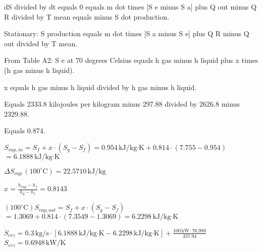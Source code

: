 dS divided by dt equals 0 equals m dot times [S e minus S a] plus Q out minus Q R divided by T mean equals minus S dot production.  

Stationary:  
S production equals m dot times [S a minus S e] plus Q R minus Q out divided by T mean.  

From Table A2:  
S e at 70 degrees Celsius equals h gas minus h liquid plus x times (h gas minus h liquid).  

x equals h gas minus h liquid divided by h gas minus h liquid.  

Equals 2333.8 kilojoules per kilogram minus 297.88 divided by 2626.8 minus 2329.88.  

Equals 0.874.

\( S_{vap,in} = S_f + x \cdot (S_g - S_f) = 0.954 \, \text{kJ/kg·K} + 0.814 \cdot (7.755 - 0.954) \)  
\( = 6.1888 \, \text{kJ/kg·K} \)  

\( \Delta S_{vap} \, (100^\circ \text{C}) = 22.5710 \, \text{kJ/kg} \)  

\( x = \frac{h_{vap} - h_f}{h_g - h_f} = 0.8143 \)  

\( (100^\circ \text{C}) S_{vap,out} = S_f + x \cdot (S_g - S_f) \)  
\( = 1.3069 + 0.814 \cdot (7.3549 - 1.3069) = 6.2298 \, \text{kJ/kg·K} \)  

\( \dot{S}_{erz} = 0.3 \, \text{kg/s} \cdot \left[ 6.1888 \, \text{kJ/kg·K} - 6.2298 \, \text{kJ/kg·K} \right] + \frac{100 \, \text{kW} \cdot 76.980}{357.94} \)  
\( \dot{S}_{erz} = 0.6948 \, \text{kW/K} \)
